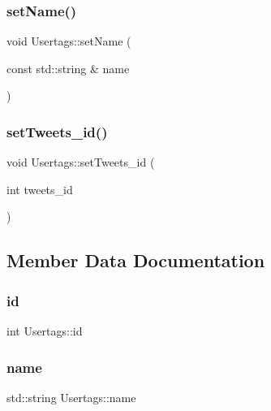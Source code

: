 \subsubsection{\texorpdfstring{set\+Name()}{setName()}}
{\footnotesize\ttfamily void Usertags\+::set\+Name (\begin{DoxyParamCaption}\item[{const std\+::string \&}]{name }\end{DoxyParamCaption})}

\mbox{\label{class_usertags_a42dd4860c07f793d877a485fae2b0e20}} 
\subsubsection{\texorpdfstring{set\+Tweets\+\_\+id()}{setTweets\_id()}}
{\footnotesize\ttfamily void Usertags\+::set\+Tweets\+\_\+id (\begin{DoxyParamCaption}\item[{int}]{tweets\+\_\+id }\end{DoxyParamCaption})}



\subsection{Member Data Documentation}
\mbox{\label{class_usertags_a43fb607a09c563f50ee0c865495956be}} 
\subsubsection{\texorpdfstring{id}{id}}
{\footnotesize\ttfamily int Usertags\+::id\hspace{0.3cm}{\ttfamily [private]}}

\mbox{\label{class_usertags_a0da849a609d0f1dad6227b9feffbcb26}} 
\subsubsection{\texorpdfstring{name}{name}}
{\footnotesize\ttfamily std\+::string Usertags\+::name\hspace{0.3cm}{\ttfamily [private]}}

